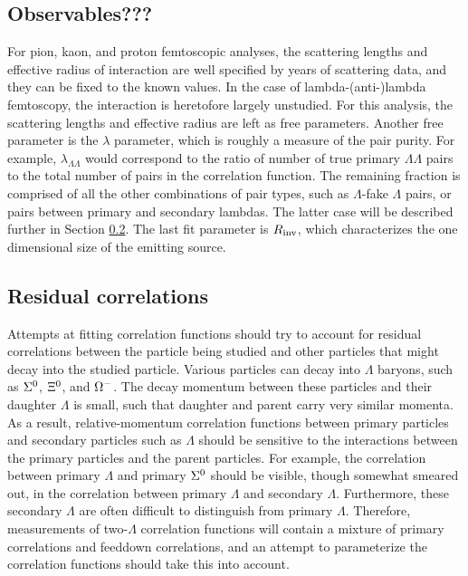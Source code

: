 \subsection{Observables???}
\label{sec:Observables}
For pion, kaon, and proton femtoscopic analyses, the scattering lengths and effective radius of interaction are well specified by years of scattering data, and they can be fixed to the known values.  In the case of lambda-(anti-)lambda femtoscopy, the interaction is heretofore largely unstudied.  For this analysis, the scattering lengths and effective radius are left as free parameters.  Another free parameter is the $\lambda$ parameter, which is roughly a measure of the pair purity.  For example, $\lambda_{\Lambda\Lambda}$ would correspond to the ratio of number of true primary $\Lambda\Lambda$ pairs to the total number of pairs in the correlation function. The remaining fraction is comprised of all the other combinations of pair types, such as $\Lambda$-fake $\Lambda$ pairs, or pairs between primary and secondary lambdas.  The latter case will be described further in Section \ref{sec:Residual}.  The last fit parameter is $R_{\rm inv}$, which characterizes the one dimensional size of the emitting source.  



\subsection{Residual correlations}
\label{sec:Residual}

Attempts at fitting correlation functions should try to account for residual correlations between the particle being studied and other particles that might decay into the studied particle.  Various particles can decay into $\Lambda$ baryons, such as $\Sigma^{\rm 0}$, $\Xi^{\rm 0}$, and $\Omega^{\rm -}$.  The decay momentum between these particles and their daughter $\Lambda$ is small, such that daughter and parent carry very similar momenta.  As a result, relative-momentum correlation functions between primary particles and secondary particles such as $\Lambda$ should be sensitive to the interactions between the primary particles and the parent particles.  For example, the correlation between primary $\Lambda$ and primary $\Sigma^{\rm 0}$ should be visible, though somewhat smeared out, in the correlation between primary $\Lambda$ and secondary $\Lambda$.  Furthermore, these secondary $\Lambda$ are often difficult to distinguish from primary $\Lambda$.  Therefore, measurements of two-$\Lambda$ correlation functions will contain a mixture of primary correlations and feeddown correlations, and an attempt to parameterize the correlation functions should take this into account.  

